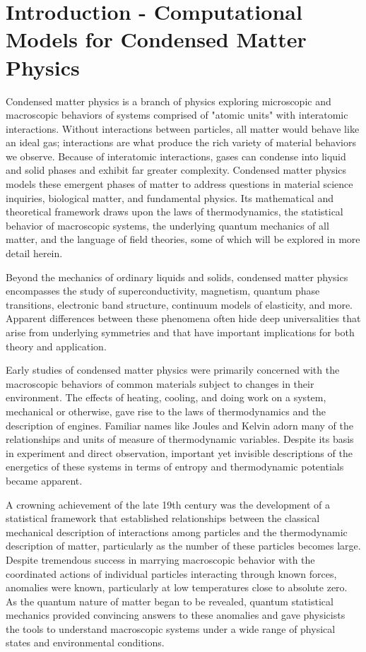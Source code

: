 \section{Introduction - Computational Models for Condensed Matter Physics}
\label{chap:Introduction}

Condensed matter physics is a branch of physics exploring microscopic and macroscopic behaviors of systems comprised of "atomic units" with interatomic interactions.  Without interactions between particles, all matter would behave like an ideal gas; interactions are what produce the rich variety of material behaviors we observe.  Because of interatomic interactions, gases can condense into liquid and solid phases and exhibit far greater complexity.  Condensed matter physics models these emergent phases of matter to address questions in material science inquiries, biological matter, and fundamental physics.  Its mathematical and theoretical framework draws upon the laws of thermodynamics, the statistical behavior of macroscopic systems, the underlying quantum mechanics of all matter, and the language of field theories, some of which will be explored in more detail herein.

Beyond the mechanics of ordinary liquids and solids, condensed matter physics encompasses the study of superconductivity, magnetism, quantum phase transitions, electronic band structure, continuum models of elasticity, and more.  Apparent differences between these phenomena often hide deep universalities that arise from underlying symmetries and that have important implications for both theory and application.

Early studies of condensed matter physics were primarily concerned with the macroscopic behaviors of common materials subject to changes in their environment.  The effects of heating, cooling, and doing work on a system, mechanical or otherwise, gave rise to the laws of thermodynamics and the description of engines.  Familiar names like Joules and Kelvin adorn many of the relationships and units of measure of thermodynamic variables.  Despite its basis in experiment and direct observation, important yet invisible descriptions of the energetics of these systems in terms of entropy and thermodynamic potentials became apparent.

A crowning achievement of the late 19th century was the development of a statistical framework that established relationships between the classical mechanical description of interactions among particles and the thermodynamic description of matter, particularly as the number of these particles becomes large.  Despite tremendous success in marrying macroscopic behavior with the coordinated actions of individual particles interacting through known forces, anomalies were known, particularly at low temperatures close to absolute zero.  As the quantum nature of matter began to be revealed, quantum statistical mechanics provided convincing answers to these anomalies and gave physicists the tools to understand macroscopic systems under a wide range of physical states and environmental conditions.

